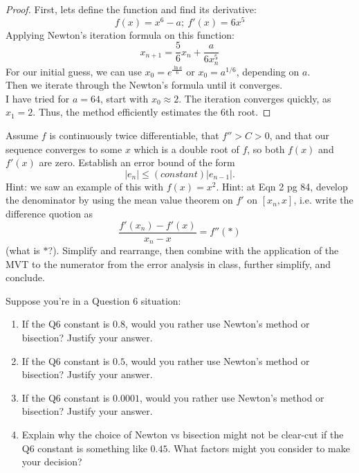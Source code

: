 \documentclass{article}
\begin{document}
\begin{proof}
    First, lets define the function and find its derivative: 
    \[ f(x) = x^6 - a; \ f'(x) = 6x^5 \]
    Applying Newton's iteration formula on this function:
    \[ x_{n+1} = \frac{5}{6}x_n + \frac{a}{6x_n^5} \]
    For our initial guess, we can use \( x_0 = e^{\frac{\ln a}{6}} \) or \( x_0 = a^{1/6} \), depending on \(a\).
    \\
    Then we iterate through the Newton's formula until it converges.
    \\
    I have tried for \( a = 64 \), start with \( x_0 \approx 2 \). The iteration converges quickly, as \( x_1 = 2 \). Thus, the method efficiently estimates the \(6\)th root.
\end{proof}


\begin{problem}
     Assume \(f\) is continuously twice differentiable, that \(f'' >C>0\), and that our sequence converges to some \(x\) which is a double root of \(f\), so both \(f(x)\) and \(f'(x)\) are zero. Establish an error bound of the form
    \[|e_n| \leq (constant) |e_{n-1}|.\]
    Hint: we saw an example of this with \(f(x) = x^2\). Hint: at Eqn 2 pg 84, develop the denominator by using the mean value theorem on \(f'\) on \([x_n,x]\), i.e. write the difference quotion as
    \[\frac{f'(x_n) - f'(x)}{x_n-x} = f''(*)\]
    (what is \(*\)?). Simplify and rearrange, then combine with the application of the MVT to the numerator from the error analysis in class, further simplify, and conclude.
\end{problem}

\begin{problem}
    Suppose you're in a Question 6 situation:
    \begin{enumerate}
        \item If the Q6 constant is \(0.8\), would you rather use Newton's method or bisection? Justify your answer.
        \item If the Q6 constant is \(0.5\), would you rather use Newton's method or bisection? Justify your answer.
        \item If the Q6 constant is \(0.0001\), would you rather use Newton's method or bisection? Justify your answer.
        \item Explain why the choice of Newton vs bisection might not be clear-cut if the Q6 constant is something like \(0.45\). What factors might you consider to make your decision?
    \end{enumerate}

\end{problem}
\end{document}
